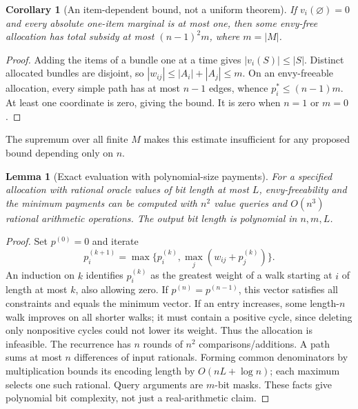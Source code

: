 \documentclass[11pt,a4paper]{article}
\newtheorem{lemma}[theorem]{Lemma}
\newtheorem{corollary}[theorem]{Corollary}
\theoremstyle{remark}\newtheorem{remark}[theorem]{Remark}
\begin{document}
\begin{corollary}[An item-dependent bound, not a uniform theorem]\label{cor:mdep}
If $v_i(\varnothing)=0$ and every absolute one-item marginal is at most one, then some envy-free allocation has total subsidy at most $(n-1)^2m$, where $m=|M|$.
\end{corollary}
\begin{proof}
Adding the items of a bundle one at a time gives $|v_i(S)|\le |S|$. Distinct allocated bundles are disjoint, so $|w_{ij}|\le|A_i|+|A_j|\le m$. On an envy-freeable allocation, every simple path has at most $n-1$ edges, whence $p_i^*\le(n-1)m$. At least one coordinate is zero, giving the bound. It is zero when $n=1$ or $m=0$.
\end{proof}
The supremum over all finite $M$ makes this estimate insufficient for any proposed bound depending only on $n$.

\begin{lemma}[Exact evaluation with polynomial-size payments]\label{lem:compute}
For a specified allocation with rational oracle values of bit length at most $L$, envy-freeability and the minimum payments can be computed with $n^2$ value queries and $O(n^3)$ rational arithmetic operations. The output bit length is polynomial in $n,m,L$.
\end{lemma}
\begin{proof}
Set $p^{(0)}=0$ and iterate
\[
p_i^{(k+1)}=\max\{p_i^{(k)},\max_j(w_{ij}+p_j^{(k)})\}.
\]
An induction on $k$ identifies $p_i^{(k)}$ as the greatest weight of a walk starting at $i$ of length at most $k$, also allowing zero. If $p^{(n)}=p^{(n-1)}$, this vector satisfies all constraints and equals the minimum vector. If an entry increases, some length-$n$ walk improves on all shorter walks; it must contain a positive cycle, since deleting only nonpositive cycles could not lower its weight. Thus the allocation is infeasible. The recurrence has $n$ rounds of $n^2$ comparisons/additions. A path sums at most $n$ differences of input rationals. Forming common denominators by multiplication bounds its encoding length by $O(nL+\log n)$; each maximum selects one such rational. Query arguments are $m$-bit masks. These facts give polynomial bit complexity, not just a real-arithmetic claim.
\end{proof}
\end{document}
